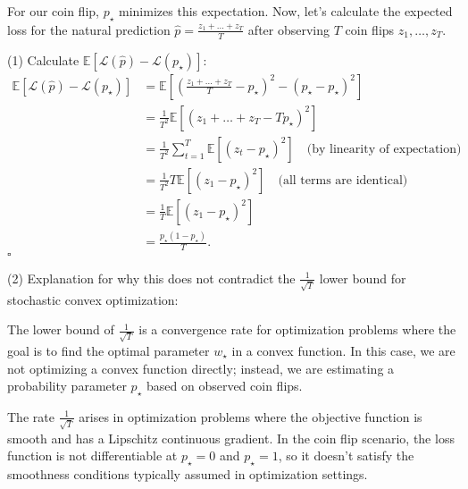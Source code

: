 \documentclass[letterpaper]{article}
\renewcommand{\L}{\mathcal{L}}
\renewcommand{\qedsymbol}{\hfill $\square$}
\begin{document}
\begin{enumerate}
    For our coin flip, \(p_\star\) minimizes this expectation. Now, let's calculate the expected loss for the natural prediction \(\hat{p} = \frac{z_1 + \dots + z_T}{T}\) after observing \(T\) coin flips \(z_1, \dots, z_T\).
    
    (1) Calculate \(\mathbb{E}[\L(\hat{p}) - \L(p_\star)]\):
    \begin{equation}
    	\begin{aligned}
    		\mathbb{E}[\L(\hat{p}) - \L(p_\star)] &= \mathbb{E}\left[\left(\frac{z_1 + \dots + z_T}{T} - p_\star\right)^2 - (p_\star - p_\star)^2\right] \\
    		&= \frac{1}{T^2}\mathbb{E}\left[(z_1 + \dots + z_T - Tp_\star)^2\right] \\
    		&= \frac{1}{T^2}\sum_{t=1}^T\mathbb{E}\left[(z_t - p_\star)^2\right] \quad \text{(by linearity of expectation)} \\
    		&= \frac{1}{T^2}T\mathbb{E}\left[(z_1 - p_\star)^2\right] \quad \text{(all terms are identical)} \\
    		&= \frac{1}{T}\mathbb{E}\left[(z_1 - p_\star)^2\right] \\
    		&= \frac{p_\star(1-p_\star)}{T}.
    	\end{aligned}
    \end{equation}
    \qedsymbol
    
    (2) Explanation for why this does not contradict the \(\frac{1}{\sqrt{T}}\) lower bound for stochastic convex optimization:
    
    The lower bound of \(\frac{1}{\sqrt{T}}\) is a convergence rate for optimization problems where the goal is to find the optimal parameter \(w_\star\) in a convex function. In this case, we are not optimizing a convex function directly; instead, we are estimating a probability parameter \(p_\star\) based on observed coin flips.
    
    The rate \(\frac{1}{\sqrt{T}}\) arises in optimization problems where the objective function is smooth and has a Lipschitz continuous gradient. In the coin flip scenario, the loss function is not differentiable at \(p_\star = 0\) and \(p_\star = 1\), so it doesn't satisfy the smoothness conditions typically assumed in optimization settings.
    
    
\end{enumerate}
\end{document}
